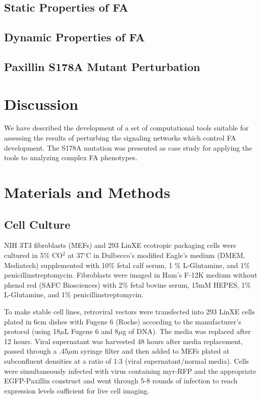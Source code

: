 \documentclass[10pt]{article}
\begin{document}
\subsection*{Static Properties of FA}

\subsection*{Dynamic Properties of FA}

\subsection*{Paxillin S178A Mutant Perturbation}

\section*{Discussion}

We have described the development of a set of computational tools suitable for
assessing the results of perturbing the signaling networks which control FA
development. The S178A mutation was presented as case study for applying the
tools to analyzing complex FA phenotypes. 

\section*{Materials and Methods}

\subsection*{Cell Culture}

NIH 3T3 fibroblasts (MEFs) and 293 LinXE ecotropic packaging cells were cultured
in 5\% CO$^2$ at 37$^\circ$C in Dulbecco's modified Eagle's medium (DMEM, Mediatech)
supplemented with 10\% fetal calf serum, 1 \% L-Glutamine, and 1\%
penicillinstreptomycin. Fibroblasts were imaged in Ham's F-12K medium without
phenol red (SAFC Biosciences) with 2\% fetal bovine serum, 15mM HEPES, 1\%
L-Glutamine, and 1\% penicillinstreptomycin. 

To make stable cell lines, retroviral vectors were transfected into 293 LinXE
cells plated in 6cm dishes with Fugene 6 (Roche) according to the manufacturer's
protocol (using 18$\mu$L Fugene 6 and 8$\mu$g of DNA). The media was replaced
after 12 hours. Viral supernatant was harvested 48 hours after media
replacement, passed through a .45$\mu$m syringe filter and then added to MEFs
plated at subconfluent densities at a ratio of 1:3 (viral supernatant/normal
media). Cells were simultaneously infected with virus containing myr-RFP and
the appropriate EGFP-Paxillin construct and went through 5-8 rounds of infection
to reach expression levels sufficient for live cell imaging.
\end{document}
